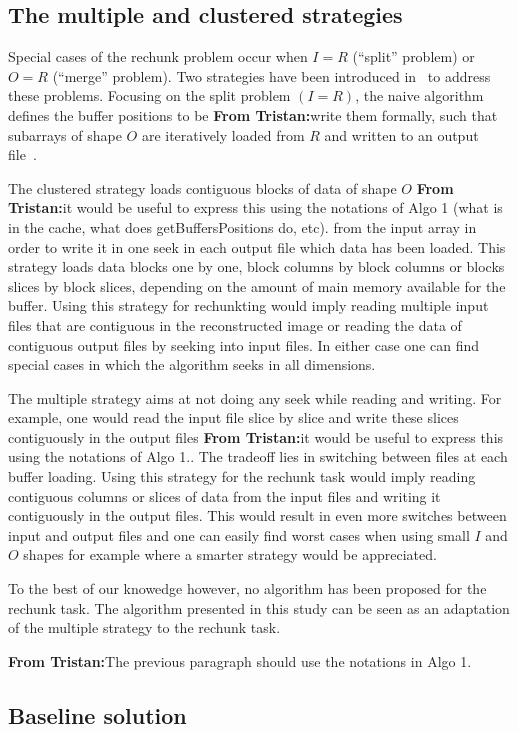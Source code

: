 \documentclass[conference]{IEEEtran}
\newcommand{\tristan}[1]{\color{orange}\textbf{From Tristan:}#1\color{black}}
\begin{document}
\subsection{The multiple and clustered strategies}
Special cases of the rechunk problem occur when $I=R$ (``split'' problem)
or $O=R$ (``merge'' problem). Two strategies have been introduced
in~\cite{seqalgorithms} to address these problems. Focusing on the split
problem $(I=R)$, the naive algorithm defines the buffer positions to be
\tristan{write them formally}, such that subarrays of shape $O$ are
iteratively loaded from $R$ and written to an output
file~\cite{seqalgorithms}.

The clustered strategy loads contiguous blocks of data of shape $O$ \tristan{it would be useful to express this using the notations of Algo 1 (what is in the cache, what does getBuffersPositions do, etc).}
from the input array in order to write it in one seek in each output file which
data has been loaded. This strategy loads data blocks one by one, block columns
by block columns or blocks slices by block slices, depending on the amount of
main memory available for the buffer. Using this strategy for rechunkting would
imply reading multiple input files that are contiguous in the reconstructed
image or reading the data of contiguous output files by seeking into input files.
In either case one can find special cases in which the algorithm seeks in all
dimensions.

The multiple strategy aims at not doing any seek while reading and writing. For
example, one would read the input file slice by slice and write these slices
contiguously in the output files \tristan{it would be useful to express this using the notations of Algo 1.}. The tradeoff lies in switching between files
at each buffer loading. Using this strategy for the rechunk task would imply
reading contiguous columns or slices of data from the input files and writing it
contiguously in the output files. This would result in even more switches
between input and output files and one can easily find worst cases when using
small $I$ and $O$ shapes for example where a smarter strategy would be appreciated.

To the best of our knowedge however, no algorithm has been proposed for the
rechunk task. The algorithm presented in this study can be seen as an
adaptation of the multiple strategy to the rechunk task.

\tristan{The previous paragraph should use the notations in Algo 1.}

\subsection{Baseline solution}
\end{document}
